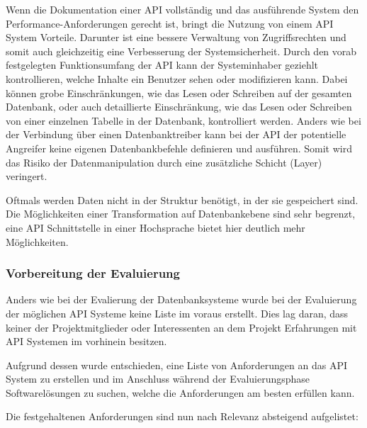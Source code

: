Wenn die Dokumentation einer API vollständig und das ausführende System den
Performance-Anforderungen gerecht ist, bringt die Nutzung von einem API System
Vorteile. Darunter ist eine bessere Verwaltung von Zugriffsrechten und somit
auch gleichzeitig eine Verbesserung der Systemsicherheit. Durch den vorab
festgelegten Funktionsumfang der API kann der Systeminhaber geziehlt
kontrollieren, welche Inhalte ein Benutzer sehen oder modifizieren kann. Dabei
können grobe Einschränkungen, wie das Lesen oder Schreiben auf der gesamten
Datenbank, oder auch detaillierte Einschränkung, wie das Lesen oder Schreiben
von einer einzelnen Tabelle in der Datenbank, kontrolliert werden. Anders wie
bei der Verbindung über einen Datenbanktreiber kann bei der API der potentielle
Angreifer keine eigenen Datenbankbefehle definieren und ausführen. Somit wird
das Risiko der Datenmanipulation durch eine zusätzliche Schicht (Layer)
veringert.

Oftmals werden Daten nicht in der Struktur benötigt, in der sie gespeichert
sind. Die Möglichkeiten einer Transformation auf Datenbankebene sind sehr
begrenzt, eine API Schnittstelle in einer Hochsprache bietet hier deutlich mehr
Möglichkeiten.
\nl%

\subsubsection{Vorbereitung der Evaluierung}
\label{subsubsec:api_vorbereitung_der_evaluierung}
Anders wie bei der Evalierung der Datenbanksysteme wurde bei der Evaluierung
der möglichen API Systeme keine Liste im voraus erstellt. Dies lag daran, dass
keiner der Projektmitglieder oder Interessenten an dem Projekt Erfahrungen mit
API Systemen im vorhinein besitzen.

Aufgrund dessen wurde entschieden, eine Liste von Anforderungen an das
API System zu erstellen und im Anschluss während der Evaluierungsphase
Softwarelösungen zu suchen, welche die Anforderungen am besten erfüllen kann.

Die festgehaltenen Anforderungen sind nun nach Relevanz absteigend aufgelistet:

